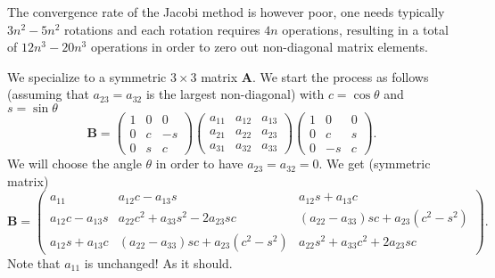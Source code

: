 \documentclass[%
oneside,                 %
final,                   %
10pt]{article}
\begin{document}
\noindent
The convergence rate of the Jacobi method is however poor, one needs typically $3n^2-5n^2$ rotations and each rotation 
requires $4n$ operations, resulting in a total of $12n^3-20n^3$ operations in order to zero out non-diagonal matrix elements.

We specialize to a symmetric $3\times 3 $ matrix $\mathbf{A}$.
We start the process as follows (assuming that $a_{23}=a_{32}$ is the largest non-diagonal)
with $c=\cos{\theta}$ and $s=\sin{\theta}$
\[
 \mathbf{B} =
      \left( \begin{array}{ccc} 
                1 & 0 & 0    \\
                0 & c & -s     \\
                0 & s & c
             \end{array} \right)\left( \begin{array}{ccc} 
                a_{11} & a_{12} & a_{13}    \\
                a_{21} & a_{22} & a_{23}     \\
                a_{31} & a_{32} & a_{33}
             \end{array} \right)
              \left( \begin{array}{ccc} 
                1 & 0 & 0    \\
                0 & c & s     \\
                0 & -s & c
             \end{array} \right).
\]
We will choose the angle $\theta$ in order to have $a_{23}=a_{32}=0$.
We get (symmetric matrix)
\[
 \mathbf{B} =\left( \begin{array}{ccc} 
                a_{11} & a_{12}c -a_{13}s& a_{12}s+a_{13}c    \\
                a_{12}c -a_{13}s & a_{22}c^2+a_{33}s^2 -2a_{23}sc& (a_{22}-a_{33})sc +a_{23}(c^2-s^2)     \\
                a_{12}s+a_{13}c & (a_{22}-a_{33})sc +a_{23}(c^2-s^2) & a_{22}s^2+a_{33}c^2 +2a_{23}sc
             \end{array} \right).
\]
Note that $a_{11}$ is unchanged! As it should.
\end{document}
